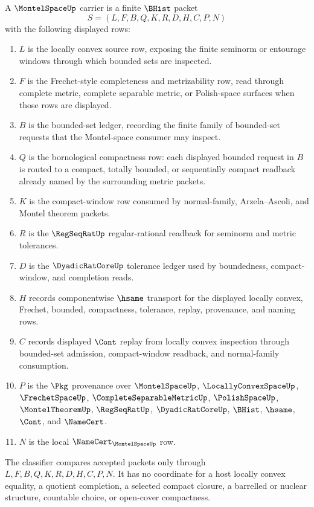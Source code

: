 \begin{definition}
\label{def:montel-space-carrier}
A $\MontelSpaceUp$ carrier is a finite $\BHist$ packet
$$
S=(L,F,B,Q,K,R,D,H,C,P,N)
$$
with the following displayed rows:
\begin{enumerate}
\item $L$ is the locally convex source row, exposing the finite seminorm or entourage windows through which bounded sets are inspected.
\item $F$ is the Frechet-style completeness and metrizability row, read through complete metric, complete separable metric, or Polish-space surfaces when those rows are displayed.
\item $B$ is the bounded-set ledger, recording the finite family of bounded-set requests that the Montel-space consumer may inspect.
\item $Q$ is the bornological compactness row: each displayed bounded request in $B$ is routed to a compact, totally bounded, or sequentially compact readback already named by the surrounding metric packets.
\item $K$ is the compact-window row consumed by normal-family, Arzela--Ascoli, and Montel theorem packets.
\item $R$ is the $\RegSeqRatUp$ regular-rational readback for seminorm and metric tolerances.
\item $D$ is the $\DyadicRatCoreUp$ tolerance ledger used by boundedness, compact-window, and completion reads.
\item $H$ records componentwise $\hsame$ transport for the displayed locally convex, Frechet, bounded, compactness, tolerance, replay, provenance, and naming rows.
\item $C$ records displayed $\Cont$ replay from locally convex inspection through bounded-set admission, compact-window readback, and normal-family consumption.
\item $P$ is the $\Pkg$ provenance over $\MontelSpaceUp$, $\LocallyConvexSpaceUp$, $\FrechetSpaceUp$, $\CompleteSeparableMetricUp$, $\PolishSpaceUp$, $\MontelTheoremUp$, $\RegSeqRatUp$, $\DyadicRatCoreUp$, $\BHist$, $\hsame$, $\Cont$, and $\NameCert$.
\item $N$ is the local $\NameCert_{\MontelSpaceUp}$ row.
\end{enumerate}
The classifier compares accepted packets only through $L,F,B,Q,K,R,D,H,C,P,N$. It has no coordinate for a host locally convex equality, a quotient completion, a selected compact closure, a barrelled or nuclear structure, countable choice, or open-cover compactness.
\end{definition}

